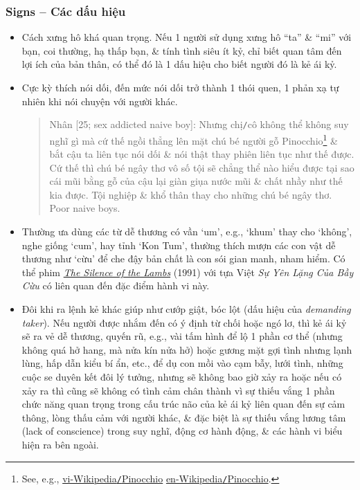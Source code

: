 \documentclass[12pt,oneside]{book}
\begin{document}
\subsubsection{Signs -- Các dấu hiệu}
\begin{itemize}
	\item Cách xưng hô khá quan trọng. Nếu 1 người sử dụng xưng hô ``ta'' \& ``mi'' với bạn, coi thường, hạ thấp bạn, \& tính tình siêu ít kỷ, chỉ biết quan tâm đến lợi ích của bản thân, có thể đó là 1 dấu hiệu cho biết người đó là kẻ ái kỷ.
	\item Cực kỳ thích nói dối, đến mức nói dối trở thành 1 thói quen, 1 phản xạ tự nhiên khi nói chuyện với người khác.
	\begin{quote}
		{\sf Nhân [25; sex addicted naive boy]}: Nhưng chị{\tt/}cô không thể không suy nghĩ gì mà cứ thế ngồi thẳng lên mặt chú bé người gỗ {\sf Pinocchio}\footnote{See, e.g., \href{https://vi.wikipedia.org/wiki/Pinocchio}{vi-Wikipedia{\tt/}Pinocchio} \href{https://en.wikipedia.org/wiki/Pinocchio}{en-Wikipedia{\tt/}Pinocchio}.} \& bắt cậu ta liên tục nói dối \& nói thật thay phiên liên tục như thế được. Cứ thế thì chú bé ngây thơ vô số tội sẽ chẳng thể nào hiểu được tại sao cái mũi bằng gỗ của cậu lại giàn giụa nước mũi \& chất nhầy như thế kia được. Tội nghiệp \& khổ thân thay cho những chú bé ngây thơ. Poor naive boys.
	\end{quote}
	\item Thường ưa dùng các từ dễ thương có vần `um', e.g., `khum' thay cho `không', nghe giống `cum', hay tỉnh `Kon Tum', thường thích mượn các con vật dễ thương như `cừu' để che đậy bản chất là con sói gian manh, nham hiểm. Có thể phim \href{https://www.imdb.com/title/tt0102926}{\it The Silence of the Lambs} (1991) với tựa Việt {\it Sự Yên Lặng Của Bầy Cừu} có liên quan đến đặc điểm hành vi này.
	\item Đôi khi ra lệnh kẻ khác giúp như cướp giật, bóc lột (dấu hiệu của {\it demanding taker}). Nếu người được nhắm đến có ý định từ chối hoặc ngó lơ, thì kẻ ái kỷ sẽ ra vẻ dễ thương, quyến rũ, e.g., vài tấm hình để lộ 1 phần cơ thể (nhưng không quá hở hang, mà nửa kín nửa hở) hoặc gương mặt gợi tình nhưng lạnh lùng, hấp dẫn kiểu bí ẩn, etc., để dụ con mồi vào cạm bẫy, lưới tình, những cuộc se duyên kết đôi lý tưởng, nhưng sẽ không bao giờ xảy ra hoặc nếu có xảy ra thì cũng sẽ không có tình cảm chân thành vì sự thiếu vắng 1 phần chức năng quan trọng trong cấu trúc não của kẻ ái kỷ liên quan đến sự cảm thông, lòng thấu cảm với người khác, \& đặc biệt là sự thiếu vắng lương tâm (lack of conscience) trong suy nghĩ, động cơ hành động, \& các hành vi biểu hiện ra bên ngoài.
\end{itemize}
\end{document}
